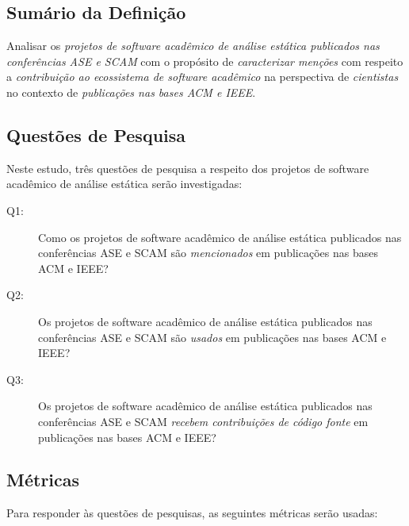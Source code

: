\subsection{Sumário da Definição}

Analisar os \textit{projetos de software acadêmico de análise estática publicados nas conferências ASE e SCAM}
com o propósito de \textit{caracterizar menções}
com respeito a \textit{contribuição ao ecossistema de software acadêmico}
na perspectiva de \textit{cientistas}
no contexto de \textit{publicações nas bases ACM e IEEE}.

\subsection{Questões de Pesquisa}


Neste estudo, três questões de pesquisa a respeito dos projetos de
software acadêmico de análise estática serão investigadas:

\newcommand{\EstudoDoisQuestaoUm}{
  Como os projetos de software acadêmico de análise estática publicados nas
  conferências ASE e SCAM são \textit{mencionados} em publicações nas bases ACM e IEEE?
}
\newcommand{\EstudoDoisQuestaoDois}{
  Os projetos de software acadêmico de análise estática publicados nas
  conferências ASE e SCAM são \textit{usados} em publicações nas bases ACM e IEEE?
}
\newcommand{\EstudoDoisQuestaoTres}{
  Os projetos de software acadêmico de análise estática publicados nas
  conferências ASE e SCAM \textit{recebem contribuições de código fonte} em publicações
  nas bases ACM e IEEE?
}

\begin{description}
  \item [Q1:] \EstudoDoisQuestaoUm
  \item [Q2:] \EstudoDoisQuestaoDois
  \item [Q3:] \EstudoDoisQuestaoTres
\end{description}

\subsection{Métricas}

Para responder às questões de pesquisas, as seguintes métricas serão usadas:

